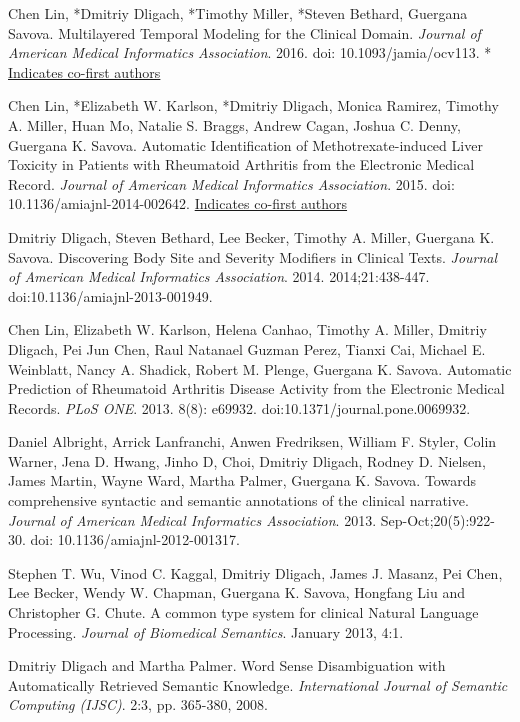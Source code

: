 \documentclass[letterpaper]{article}
\renewenvironment{itemize}{
  \begin{list}{}{
    \setlength{\leftmargin}{1.5em}
  }
}{
  \end{list}
}
\begin{document}
\begin{itemize}
\item *Chen Lin, *Dmitriy Dligach, *Timothy Miller, *Steven Bethard, Guergana Savova. Multilayered Temporal Modeling for the Clinical Domain. \emph{Journal of American Medical Informatics Association}. 2016. doi: 10.1093/jamia/ocv113. * \underline{Indicates co-first authors}
\item *Chen Lin, *Elizabeth W. Karlson, *Dmitriy Dligach, Monica Ramirez, Timothy A. Miller, Huan Mo, Natalie S. Braggs, Andrew Cagan, Joshua C. Denny, Guergana K. Savova. Automatic Identification of Methotrexate-induced Liver Toxicity in Patients with Rheumatoid Arthritis from the Electronic Medical Record. \emph{Journal of American Medical Informatics Association}. 2015. doi: 10.1136/amiajnl-2014-002642. \newline * \underline{Indicates co-first authors}
\item Dmitriy Dligach, Steven Bethard, Lee Becker, Timothy A. Miller, Guergana K. Savova. Discovering Body Site and Severity Modifiers in Clinical Texts. \emph{Journal of American Medical Informatics Association}. 2014. 2014;21:438-447. doi:10.1136/amiajnl-2013-001949.
\item Chen Lin, Elizabeth W. Karlson, Helena Canhao, Timothy A. Miller, Dmitriy Dligach, Pei Jun Chen, Raul Natanael Guzman Perez, Tianxi Cai, Michael E. Weinblatt, Nancy A. Shadick, Robert M. Plenge, Guergana K. Savova. Automatic Prediction of Rheumatoid Arthritis Disease Activity from the Electronic Medical Records. \emph{PLoS ONE}. 2013. 8(8): e69932. doi:10.1371/journal.pone.0069932.
\item Daniel Albright, Arrick Lanfranchi, Anwen Fredriksen, William F. Styler, Colin Warner, Jena D. Hwang, Jinho D, Choi, Dmitriy Dligach, Rodney D. Nielsen, James Martin, Wayne Ward, Martha Palmer, Guergana K. Savova. Towards comprehensive syntactic and semantic annotations of the clinical narrative. \emph{Journal of American Medical Informatics Association}. 2013. Sep-Oct;20(5):922-30. doi: 10.1136/amiajnl-2012-001317.
\item Stephen T. Wu, Vinod C. Kaggal, Dmitriy Dligach, James J. Masanz, Pei Chen, Lee Becker, Wendy W. Chapman, Guergana K. Savova, Hongfang Liu and Christopher G. Chute. A common type system for clinical Natural Language Processing. \emph{Journal of Biomedical Semantics}. January 2013, 4:1.
\item Dmitriy Dligach and Martha Palmer. Word Sense Disambiguation with Automatically Retrieved Semantic Knowledge. \emph {International Journal of Semantic Computing (IJSC)}. 2:3, pp. 365-380, 2008.
\end{itemize}
\end{document}
